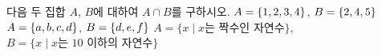 다음 두 집합 $A$, $B$에 대하여 $A\cap B$를 구하시오.
 $A=\{1{,}\mkern3mu\mathopen{}2{,}\mkern3mu\mathopen{}3{,}\mkern3mu\mathopen{}4\}$, $B=\{2{,}\mkern3mu\mathopen{}4{,}\mkern3mu\mathopen{}5\}$
 $A=\{a{,}\mkern3mu\mathopen{}b{,}\mkern3mu\mathopen{}c{,}\mkern3mu\mathopen{}d\}$, $B=\{d{,}\mkern3mu\mathopen{}e{,}\mkern3mu\mathopen{}f\}$
 $A=\{x \mid x$는 짝수인 자연수$\}$,\\ $B=\{x \mid x$는 $10$ 이하의 자연수$\}$
